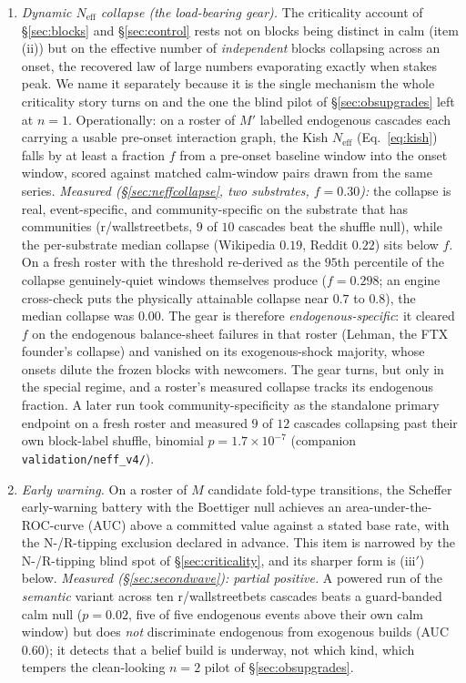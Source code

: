 \documentclass[11pt]{article}
\begin{document}
\begin{enumerate}[label=(\roman*),itemsep=2pt]
\item[(ii$'$)] \emph{Dynamic $N_{\mathrm{eff}}$ collapse (the load-bearing gear).} The criticality account of \S\ref{sec:blocks} and \S\ref{sec:control} rests not on blocks being distinct in calm (item (ii)) but on the effective number of \emph{independent} blocks collapsing across an onset, the recovered law of large numbers evaporating exactly when stakes peak. We name it separately because it is the single mechanism the whole criticality story turns on and the one the blind pilot of \S\ref{sec:obsupgrades} left at $n=1$. Operationally: on a roster of $M'$ labelled endogenous cascades each carrying a usable pre-onset interaction graph, the Kish $N_{\mathrm{eff}}$ (Eq.~\eqref{eq:kish}) falls by at least a fraction $f$ from a pre-onset baseline window into the onset window, scored against matched calm-window pairs drawn from the same series. \emph{Measured (\S\ref{sec:neffcollapse}, two substrates, $f=0.30$):} the collapse is real, event-specific, and community-specific on the substrate that has communities (r/wallstreetbets, $9$ of $10$ cascades beat the shuffle null), while the per-substrate median collapse (Wikipedia $0.19$, Reddit $0.22$) sits below $f$. On a fresh roster with the threshold re-derived as the $95$th percentile of the collapse genuinely-quiet windows themselves produce ($f=0.298$; an engine cross-check puts the physically attainable collapse near $0.7$ to $0.8$), the median collapse was $0.00$. The gear is therefore \emph{endogenous-specific}: it cleared $f$ on the endogenous balance-sheet failures in that roster (Lehman, the FTX founder's collapse) and vanished on its exogenous-shock majority, whose onsets dilute the frozen blocks with newcomers. The gear turns, but only in the special regime, and a roster's measured collapse tracks its endogenous fraction. A later run took community-specificity as the standalone primary endpoint on a fresh roster and measured $9$ of $12$ cascades collapsing past their own block-label shuffle, binomial $p = 1.7\times10^{-7}$ (companion \texttt{validation/neff\_v4/}).
\item \emph{Early warning.} On a roster of $M$ candidate fold-type transitions, the Scheffer early-warning battery with the Boettiger null \cite{scheffer2009,boettiger2012} achieves an area-under-the-ROC-curve (AUC) above a committed value against a stated base rate, with the N-/R-tipping exclusion declared in advance. This item is narrowed by the N-/R-tipping blind spot of \S\ref{sec:criticality}, and its sharper form is (iii$'$) below. \emph{Measured (\S\ref{sec:secondwave}): partial positive.} A powered run of the \emph{semantic} variant across ten r/wallstreetbets cascades beats a guard-banded calm null ($p=0.02$, five of five endogenous events above their own calm window) but does \emph{not} discriminate endogenous from exogenous builds (AUC $0.60$); it detects that a belief build is underway, not which kind, which tempers the clean-looking $n=2$ pilot of \S\ref{sec:obsupgrades}.

\end{enumerate}
\end{document}
